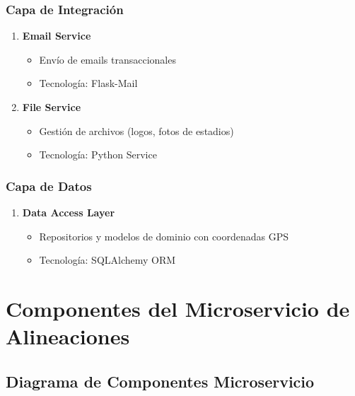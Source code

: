 \documentclass[
  spanish,
  11pt,
  letterpaper,
]{book}
\providecommand{\tightlist}{%
  \setlength{\itemsep}{0pt}\setlength{\parskip}{0pt}}
\begin{document}
\subsubsection{Capa de Integración}\label{capa-de-integraciuxf3n}

\begin{enumerate}
\def\labelenumi{\arabic{enumi}.}
\setcounter{enumi}{7}
\tightlist
\item
  \textbf{Email Service}

  \begin{itemize}
  \tightlist
  \item
    Envío de emails transaccionales
  \item
    Tecnología: Flask-Mail
  \end{itemize}
\item
  \textbf{File Service}

  \begin{itemize}
  \tightlist
  \item
    Gestión de archivos (logos, fotos de estadios)
  \item
    Tecnología: Python Service
  \end{itemize}
\end{enumerate}

\subsubsection{Capa de Datos}\label{capa-de-datos}

\begin{enumerate}
\def\labelenumi{\arabic{enumi}.}
\setcounter{enumi}{9}
\tightlist
\item
  \textbf{Data Access Layer}

  \begin{itemize}
  \tightlist
  \item
    Repositorios y modelos de dominio con coordenadas GPS
  \item
    Tecnología: SQLAlchemy ORM
  \end{itemize}
\end{enumerate}

\section{Componentes del Microservicio de
Alineaciones}\label{componentes-del-microservicio-de-alineaciones}

\subsection{Diagrama de Componentes
Microservicio}\label{diagrama-de-componentes-microservicio}
\end{document}
